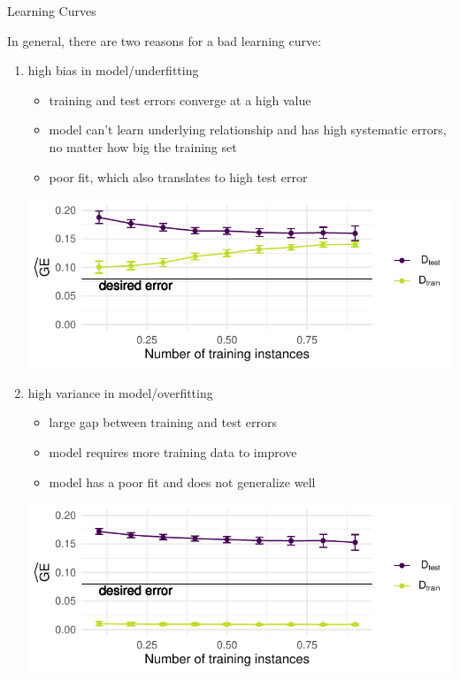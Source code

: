 \begin{frame}[c,allowframebreaks]{Learning Curves}
    \framebreak

    In general, there are two reasons for a bad learning curve:

    \begin{enumerate}
    \item high bias in model/underfitting
    \begin{itemize}
    \item training and test errors converge at a high value
    \item model can't learn underlying relationship and has high systematic errors, no matter how big the training set
    \item poor fit, which also translates to high test error
    \end{itemize}

    \begin{center}
    \includegraphics[width=.7\textwidth]{learning-curve-underfitting}
    \end{center}

    \framebreak

    \item high variance in model/overfitting
    \begin{itemize}
    \item large gap between training and test errors
    \item model requires more training data to improve
    \item model has a poor fit and does not generalize well
    \end{itemize}

    \begin{center}
    \includegraphics[width=.7\textwidth]{learning-curve-overfitting}
    \end{center}

    \end{enumerate}
    \end{frame}



